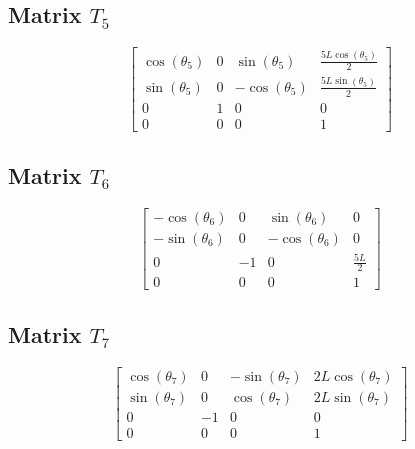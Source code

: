 \subsection*{Matrix $T_{5}$}
\[ \left[\begin{matrix}\cos{\left(\theta_{5} \right)} & 0 & \sin{\left(\theta_{5} \right)} & \frac{5 L \cos{\left(\theta_{5} \right)}}{2}\\\sin{\left(\theta_{5} \right)} & 0 & - \cos{\left(\theta_{5} \right)} & \frac{5 L \sin{\left(\theta_{5} \right)}}{2}\\0 & 1 & 0 & 0\\0 & 0 & 0 & 1\end{matrix}\right] \]
\subsection*{Matrix $T_{6}$}
\[ \left[\begin{matrix}- \cos{\left(\theta_{6} \right)} & 0 & \sin{\left(\theta_{6} \right)} & 0\\- \sin{\left(\theta_{6} \right)} & 0 & - \cos{\left(\theta_{6} \right)} & 0\\0 & -1 & 0 & \frac{5 L}{2}\\0 & 0 & 0 & 1\end{matrix}\right] \]
\subsection*{Matrix $T_{7}$}
\[ \left[\begin{matrix}\cos{\left(\theta_{7} \right)} & 0 & - \sin{\left(\theta_{7} \right)} & 2 L \cos{\left(\theta_{7} \right)}\\\sin{\left(\theta_{7} \right)} & 0 & \cos{\left(\theta_{7} \right)} & 2 L \sin{\left(\theta_{7} \right)}\\0 & -1 & 0 & 0\\0 & 0 & 0 & 1\end{matrix}\right] \]
